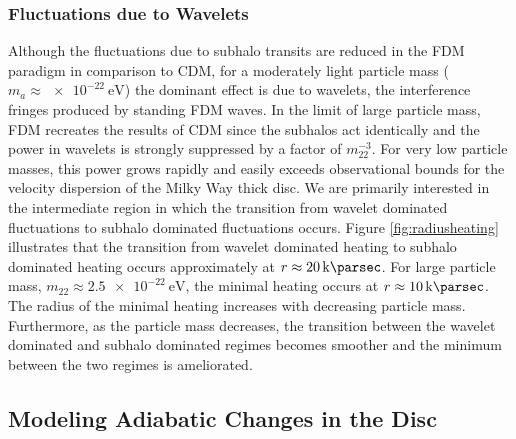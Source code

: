 \documentclass[usenatbib]{mnras}
\begin{document}
\subsubsection{Fluctuations due to Wavelets}

Although the fluctuations due to subhalo transits are reduced in the FDM paradigm in comparison to CDM, for a moderately light particle mass ($m_a \approx \SI{e-22}{\electronvolt}$) the dominant effect is due to wavelets, the interference fringes produced by standing FDM waves. In the limit of large particle mass, FDM recreates the results of CDM since the subhalos act identically and the power in wavelets is strongly suppressed by a factor of $m_{22}^{-3}$. For very low particle masses, this power grows rapidly and easily exceeds observational bounds for the velocity dispersion of the Milky Way thick disc. We are primarily interested in the intermediate region in which the transition from wavelet dominated fluctuations to subhalo dominated fluctuations occurs. Figure \ref{fig:radiusheating} illustrates that the transition from wavelet dominated heating to subhalo dominated heating occurs approximately at $r \approx \SI{20}{\kilo \parsec}$. For large particle mass, $m_{22} \approx \SI{2.5e-22}{\electronvolt}$, the minimal heating occurs at $r \approx \SI{10}{\kilo \parsec}$. The radius of the minimal heating increases with decreasing particle mass. Furthermore, as the particle mass decreases, the transition between the wavelet dominated and subhalo dominated regimes becomes smoother and the minimum between the two regimes is ameliorated.   

\subsection{Modeling Adiabatic Changes in the Disc}
\end{document}
